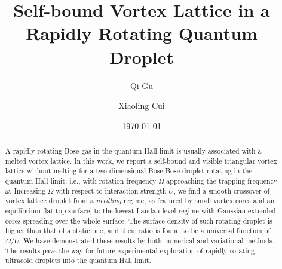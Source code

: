 \documentclass[reprint,aps,prl,twocolumn,superscriptaddress]{revtex4-1}
\begin{document}
\title{Self-bound Vortex Lattice in a Rapidly Rotating Quantum Droplet}
\author{Qi Gu}
\author{Xiaoling Cui}

\date{\today} 


\begin{abstract}
A rapidly rotating Bose gas in the quantum Hall limit is usually associated with a melted vortex lattice. 
In this work, we report a self-bound and visible triangular vortex lattice without melting for a two-dimensional Bose-Bose droplet rotating in the quantum Hall limit, i.e., with rotation frequency $\Omega$ approaching the trapping frequency $\omega$.
Increasing $\Omega$ with respect to interaction strength $U$, we find a smooth crossover of vortex lattice droplet from a {\it needling} regime, as featured by small vortex cores and an equilibrium flat-top surface, to the lowest-Landau-level regime with Gaussian-extended cores spreading over the whole surface.   
The surface density of such rotating droplet is higher than that of a static one, and their ratio is found to be a universal function of $\Omega/U$. We have demonstrated these results by both numerical and variational methods. The results pave the way for future experimental exploration of rapidly rotating ultracold droplets into the quantum Hall limit.  
\end{abstract}
\maketitle
\end{document}
